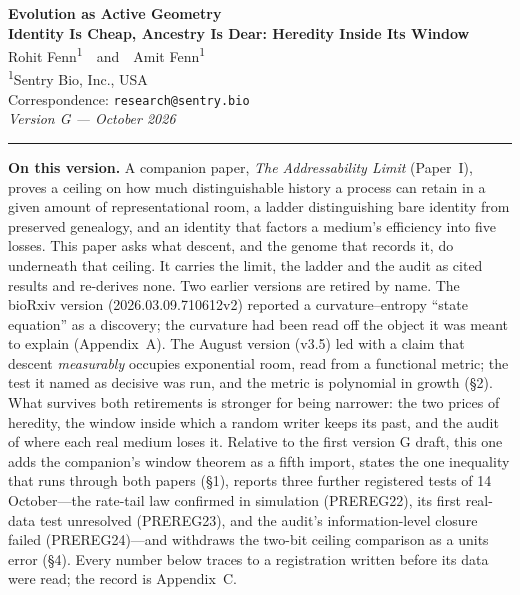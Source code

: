 \documentclass[11pt]{article}
\begin{document}
\thispagestyle{empty}

\begin{center}
{\LARGE\bfseries Evolution as Active Geometry}\\[4pt]
{\Large\bfseries Identity Is Cheap, Ancestry Is Dear: Heredity Inside Its Window}\\[16pt]
{\large Rohit Fenn\textsuperscript{1}\ \ and\ \ Amit Fenn\textsuperscript{1}}\\[4pt]
{\small\textsuperscript{1}Sentry Bio, Inc., USA}\\[2pt]
{\small Correspondence: \texttt{research@sentry.bio}}\\[2pt]
{\small\itshape Version G --- October 2026}
\end{center}

\vspace{6pt}\noindent\rule{\textwidth}{0.4pt}\vspace{4pt}

\footnotesize
\noindent\textbf{On this version.} A companion paper, \emph{The Addressability Limit} (Paper~I), proves a ceiling on how much distinguishable history a process can retain in a given amount of representational room, a ladder distinguishing bare identity from preserved genealogy, and an identity that factors a medium's efficiency into five losses. This paper asks what descent, and the genome that records it, do underneath that ceiling. It carries the limit, the ladder and the audit as cited results and re-derives none. Two earlier versions are retired by name. The bioRxiv version (2026.03.09.710612v2) reported a curvature--entropy ``state equation'' as a discovery; the curvature had been read off the object it was meant to explain (Appendix~A). The August version (v3.5) led with a claim that descent \emph{measurably} occupies exponential room, read from a functional metric; the test it named as decisive was run, and the metric is polynomial in growth (\S2). What survives both retirements is stronger for being narrower: the two prices of heredity, the window inside which a random writer keeps its past, and the audit of where each real medium loses it. Relative to the first version G draft, this one adds the companion's window theorem as a fifth import, states the one inequality that runs through both papers (\S1), reports three further registered tests of 14 October---the rate-tail law confirmed in simulation (PREREG22), its first real-data test unresolved (PREREG23), and the audit's information-level closure failed (PREREG24)---and withdraws the two-bit ceiling comparison as a units error (\S4). Every number below traces to a registration written before its data were read; the record is Appendix~C.\normalsize
\end{document}
